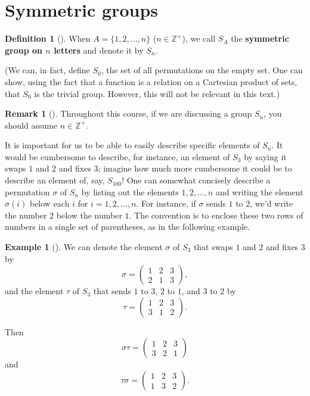 \documentclass[10pt,openany,oneside]{book}
\newcommand{\terminology}[1]{\textbf{#1}}
\theoremstyle{plain}
\theoremstyle{definition}
\newtheorem{definition}[theorem]{Definition}
\theoremstyle{definition}
\newtheorem{remark}[theorem]{Remark}
\theoremstyle{definition}
\newtheorem{example}[theorem]{Example}
\theoremstyle{definition}
\numberwithin{equation}{section}
\def\Z{\mathbb{Z}}
\newcommand{\amp}{&}
\begin{document}
\section[{Symmetric groups}]{Symmetric groups}\label{section-18}
\begin{definition}[{}]\label{definition-45}
\label{notation-57}
When \(A=\{1,2,\ldots, n\}\) (\(n\in \Z^+\)), we call \(S_A\) the \terminology{symmetric group on \(n\) letters} and denote it by \(S_n\).%
\par
(We can, in fact,  define \(S_0\), the set of all permutations on the empty set. One can show, using the fact that a function is a relation on a Cartesian product of sets, that \(S_0\) is the trivial group. However, this will not be relevant in this text.)%
\end{definition}
\begin{remark}[]\label{remark-26}
Throughout this course, if we are discussing a group \(S_n\), you should assume \(n\in \Z^+\).%
\end{remark}
It is important for us to be able to easily describe specific elements of \(S_n\). It would be cumbersome to describe, for instance, an element of \(S_3\) by saying it swaps \(1\) and \(2\) and fixes \(3\); imagine how much more cumbersome it could be to describe an element of, say, \(S_{100}\)! One can somewhat concisely describe a permutation \(\sigma\) of \(S_n\) by listing out the elements \(1,2,\ldots,n\) and writing the element \(\sigma(i)\) below each \(i\) for \(i=1,2,\ldots, n\). For instance, if \(\sigma\) sends \(1\) to \(2\), we'd write the number \(2\) below the number \(1\). The convention is to enclose these two rows of numbers in a single set of parentheses, as in the following example.%
\begin{example}[]\label{nocommute}
We can denote the element \(\sigma\) of \(S_3\) that swaps \(1\) and \(2\) and fixes \(3\) by%
\begin{equation*}
\sigma = \begin{pmatrix}1\amp 2\amp 3\\ 2\amp 1\amp 3
\end{pmatrix},
\end{equation*}
and the element \(\tau\) of \(S_3\) that sends \(1\) to \(3\), \(2\) to \(1\), and \(3\) to \(2\) by%
\begin{equation*}
\tau =\begin{pmatrix}1\amp 2\amp 3\\ 3\amp 1\amp 2
\end{pmatrix}.
\end{equation*}
%
\par
Then%
\begin{equation*}
\sigma\tau = \begin{pmatrix}1\amp 2\amp 3\\ 3\amp 2\amp 1
\end{pmatrix}
\end{equation*}
and%
\begin{equation*}
\tau\sigma = \begin{pmatrix}1\amp 2\amp 3\\ 1\amp 3\amp 2
\end{pmatrix}.
\end{equation*}
%
\end{example}
\end{document}
